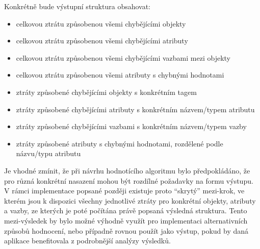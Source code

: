 Konkrétně bude výstupní struktura obsahovat:
\begin{itemize}
	\item celkovou ztrátu způsobenou všemi chybějícími objekty
	\item celkovou ztrátu způsobenou všemi chybějícími atributy
	\item celkovou ztrátu způsobenou všemi chybějícími vazbami mezi objekty
	\item celkovou ztrátu způsobenou všemi atributy s chybnými hodnotami
	\item ztráty způsobené chybějícími objekty s konkrétním tagem
	\item ztráty způsobené chybějícími atributy s konkrétním názvem/typem atributu
	\item ztráty způsobené chybějícími vazbami s konkrétním názvem/typem vazby
	\item ztráty způsobené atributy s chybnými hodnotami, rozdělené podle názvu/typu atributu
\end{itemize}

Je vhodné zmínit, že při návrhu hodnotícího algoritmu bylo předpokládáno, že pro různá konkrétní nasazení mohou být rozdílné požadavky na formu výstupu.
V rámci implementace popsané později existuje proto \enquote{skrytý} mezi-krok, ve kterém jsou k dispozici všechny jednotlivé ztráty pro konkrétní objekty, atributy a vazby,
ze kterých je poté počítána právě popsaná výsledná struktura.
Tento mezi-výsledek by bylo možné výhodně využít pro implementaci alternativních způsobů hodnocení, nebo případně rovnou použít jako výstup,
pokud by daná aplikace benefitovala z podrobnější analýzy výsledků.
